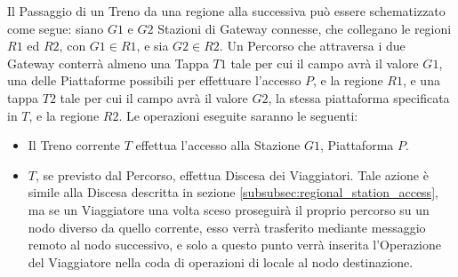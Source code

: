 	Il Passaggio di un Treno da una regione alla successiva può essere schematizzato come segue: siano $G1$ e $G2$  Stazioni di Gateway connesse, che collegano le regioni $R1$ ed $R2$, con $G1 \in R1$, e sia $G2 \in R2$. Un Percorso che attraversa i due Gateway conterrà almeno una Tappa $T1$ tale per cui il campo  avrà il valore $G1$,  una delle Piattaforme possibili per effettuare l'accesso $P$, e  la regione $R1$, e una tappa $T2$ tale per cui il campo  avrà il valore $G2$,  la stessa piattaforma specificata in $T$, e  la regione $R2$.
	Le operazioni eseguite saranno le seguenti:
	\begin{itemize}
		\item Il Treno corrente $T$ effettua l'accesso alla Stazione $G1$, Piattaforma $P$.
		
		\item $T$, se previsto dal Percorso, effettua Discesa dei Viaggiatori. Tale azione è simile alla Discesa descritta in sezione \ref{subsubsec:regional_station_access}, ma se un Viaggiatore una volta sceso proseguirà il proprio percorso su un nodo diverso da quello corrente, esso verrà trasferito mediante messaggio remoto al nodo successivo, e solo a questo punto verrà inserita l'Operazione  del Viaggiatore nella coda di operazioni di  locale al nodo destinazione.
		

\end{itemize}
